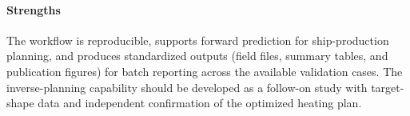 \paragraph{Strengths}
The workflow is reproducible, supports forward prediction for ship-production planning, and produces standardized outputs (field files, summary tables, and publication figures) for batch reporting across the available validation cases. The inverse-planning capability should be developed as a follow-on study with target-shape data and independent confirmation of the optimized heating plan.
